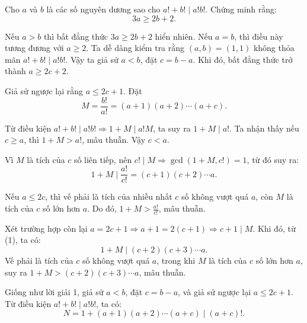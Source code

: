\ifshowproblemandsoln
\ifshowproblem\begin{problem}\label{problem:IMO-2015-SL-P2}\fi
\ifshowsoln\begin{problem}\fi
    Cho \( a \) và \( b \) là các số nguyên dương sao cho \( a! + b! \mid a!b! \).  
    Chứng minh rằng:
    \[
        3a \ge 2b + 2.
    \]
\end{problem}
\fi

\ifshowsoln
\begin{soln}\footnotemark
    Nếu \( a > b \) thì bất đẳng thức \( 3a \ge 2b + 2 \) hiển nhiên. Nếu \( a = b \), thì điều này tương đương với \( a \ge 2 \).
    Ta dễ dàng kiểm tra rằng \( (a, b) = (1,1) \) không thỏa mãn \( a! + b! \mid a!b! \). Vậy ta giả sử \( a < b \), đặt \( c = b - a \).
    Khi đó, bất đẳng thức trở thành \( a \ge 2c + 2 \).

    Giả sử ngược lại rằng \( a \le 2c + 1 \). Đặt
    \[
        M = \frac{b!}{a!} = (a+1)(a+2)\cdots(a+c).
    \]

    Từ điều kiện \( a! + b! \mid a!b! \Rightarrow 1 + M \mid a!M \), ta suy ra \( 1 + M \mid a! \). Ta nhận thấy nếu \( c \ge a \), thì \( 1 + M > a! \), mâu thuẫn.
    Vậy \( c < a \).

    Vì \( M \) là tích của \( c \) số liên tiếp, nên \( c! \mid M \Rightarrow \gcd(1 + M, c!) = 1 \), từ đó suy ra:
    \[
        1 + M \mid \frac{a!}{c!} = (c+1)(c+2)\cdots a. \tag{1}
    \]

    Nếu \( a \le 2c \), thì vế phải là tích của nhiều nhất \( c \) số không vượt quá \( a \), còn \( M \) là tích của \( c \) số lớn hơn \( a \).
    Do đó, \( 1 + M > \frac{a!}{c!} \), mâu thuẫn.

    Xét trường hợp còn lại \( a = 2c + 1 \Rightarrow a + 1 = 2(c + 1) \Rightarrow c + 1 \mid M \). Khi đó, từ (1), ta có:
    \[
        1 + M \mid (c+2)(c+3)\cdots a.
    \]
    Vế phải là tích của \( c \) số không vượt quá \( a \), trong khi \( M \) là tích của \( c \) số lớn hơn \( a \),
    suy ra \( 1 + M > (c+2)(c+3)\cdots a \), mâu thuẫn.
\end{soln}

\begin{soln}
    Giống như lời giải 1, giả sử \( a < b \), đặt \( c = b - a \), và giả sử ngược lại \( a \le 2c + 1 \). Từ điều kiện \( a! + b! \mid a!b! \), ta có:
    \[
        N = 1 + (a+1)(a+2)\cdots(a+c) \mid (a+c)!.
    \]


\end{soln}
\end{problem}

